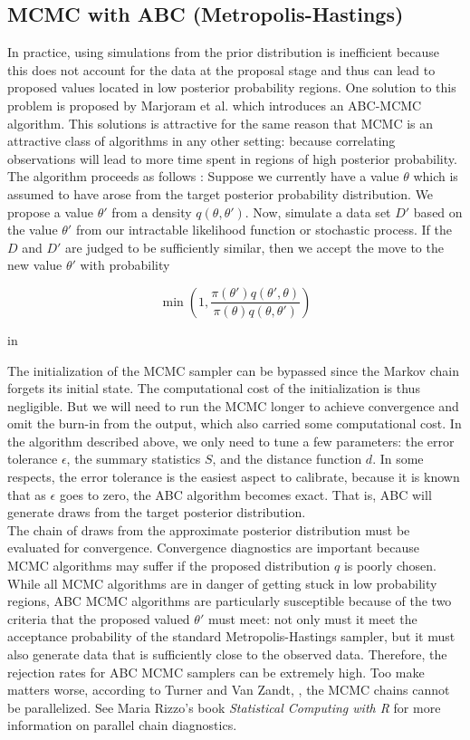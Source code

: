 \documentclass[12pt]{article}
\begin{document}
\subsection{MCMC with ABC (Metropolis-Hastings)}

In practice, using simulations from the prior distribution is inefficient because this does not account for the data at the proposal stage and thus can lead to proposed values located in low posterior probability regions. One solution to this problem is proposed by Marjoram et al. \cite{marj} which introduces an ABC-MCMC algorithm. This solutions is attractive for the same reason  that MCMC is an attractive class of algorithms in any other setting: because correlating observations will lead to more time spent in regions of high posterior probability.\\

The algorithm proceeds as follows :  Suppose we currently have a value $\theta$ which is assumed to have arose from the target posterior probability distribution. We propose a value $\theta'$ from a density $q(\theta, \theta')$. Now, simulate a data set $D'$ based on the value $\theta'$ from our intractable likelihood function or stochastic process. If the  $D$ and $D'$ are judged to be sufficiently similar, then we accept the move to the new value $\theta'$ with probability

$$ \min \left ( 1 , \frac{\pi ( \theta') q (\theta' , \theta) }{ \pi(\theta) q ( \theta, \theta')}\right)$$


 in

The initialization of the MCMC sampler can be bypassed since the Markov chain forgets its initial state. The computational cost of the initialization is thus negligible. But we will need to run the MCMC longer to achieve convergence and omit the burn-in from the output, which also carried some computational cost. In the algorithm described above, we only need to tune a few parameters: the error tolerance $\epsilon$, the summary statistics $S$, and the distance function $d$. In some respects, the error tolerance is the easiest aspect to calibrate, because it is known that as $\epsilon$ goes to zero, the ABC algorithm becomes exact. That is, ABC will generate draws from the target posterior distribution.\\

The chain of draws from the approximate posterior distribution must be evaluated for convergence. Convergence diagnostics are important because MCMC algorithms may suffer if the proposed distribution $q$ is poorly chosen. While all MCMC algorithms are in danger of getting stuck in low probability regions, ABC MCMC algorithms are particularly susceptible because of the two criteria that the proposed valued $\theta'$ must meet: not only must it meet the acceptance probability of the standard Metropolis-Hastings sampler, but it must also generate data that is sufficiently close to the observed  data.  Therefore, the rejection rates for ABC MCMC samplers can be extremely high. Too make matters worse, according to Turner and Van Zandt, \cite{turner}, the MCMC chains cannot be parallelized. See Maria Rizzo's book \textit{Statistical Computing with R} for more information on parallel chain diagnostics. 
\end{document}
